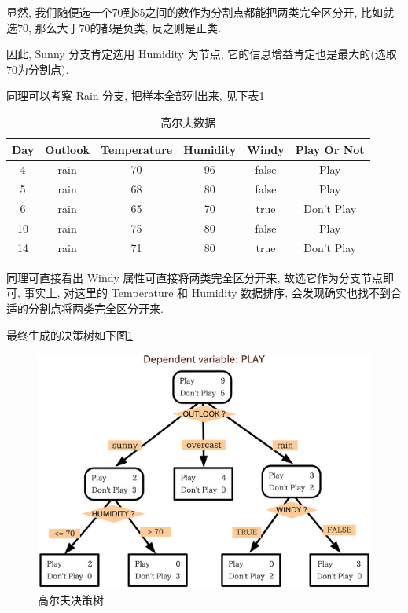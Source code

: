 \documentclass[a4paper,UTF8]{ctexart}
\theoremstyle{plain} \newtheorem{theorem}{定理}[section]
\theoremstyle{plain} \newtheorem{definition}{定义}[section]
\theoremstyle{plain} \newtheorem{lemma}{引理}[section]
\theoremstyle{plain} \newtheorem{proposition}{命题}[section]
\theoremstyle{plain} \newtheorem{example}{例}
\theoremstyle{plain} \newtheorem{remark}{注}
\theoremstyle{plain} \newtheorem{corollary}{推论}[section]
\begin{document}
显然, 我们随便选一个$70$到$85$之间的数作为分割点都能把两类完全区分开, 比如就选$70$, 那么大于$70$的都是负类, 反之则是正类.

因此, Sunny 分支肯定选用 Humidity 为节点, 它的信息增益肯定也是最大的(选取$70$为分割点).

同理可以考察 Rain 分支, 把样本全部列出来, 见下表\ref{golfrain}
\begin{table}[!htb]
\centering
\caption{高尔夫数据}
\label{golfrain}
\begin{tabular}{c|c|c|c|c|c}
  \hline
    \textbf{Day} & \textbf{Outlook} & \textbf{Temperature} & \textbf{Humidity} & \textbf{Windy} & \textbf{Play Or Not} \\
    \hline
    4 & rain & 70 & 96 & false & Play \\ 
    \hline
    5 & rain & 68 & 80 & false & Play \\ 
    \hline
    6 & rain & 65 & 70 & true &  Don't Play \\ 
    \hline
    10 & rain & 75 & 80 & false & Play \\ 
    \hline
    14 & rain & 71 & 80 & true & Don't Play \\ 
  \hline
\end{tabular}
\end{table}

同理可直接看出 Windy 属性可直接将两类完全区分开来, 故选它作为分支节点即可, 事实上, 对这里的 Temperature 和 Humidity 数据排序, 会发现确实也找不到合适的分割点将两类完全区分开来.

最终生成的决策树如下图\ref{palygolf}
\begin{figure}[!htb]
    \centering
    \includegraphics[width = 0.80 \textwidth]{play_golf.png}
    \caption{高尔夫决策树}
    \label{palygolf}
\end{figure}
\end{document}
